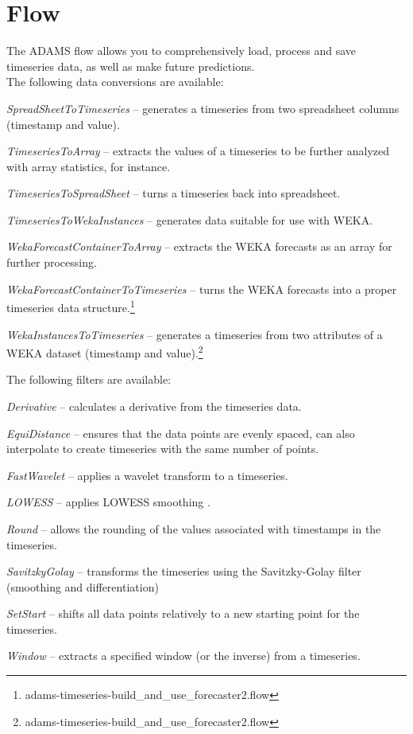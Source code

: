 \documentclass[a4paper]{book}
\begin{document}
\chapter{Flow}
The ADAMS flow allows you to comprehensively load, process and save timeseries
data, as well as make future predictions. \\

\noindent The following data conversions are available:
\begin{tight_itemize}
	\item \textit{SpreadSheetToTimeseries} -- generates a timeseries from two
	spreadsheet columns (timestamp and value).
	\item \textit{TimeseriesToArray} -- extracts the values of a timeseries to
	be further analyzed with array statistics, for instance.
	\item \textit{TimeseriesToSpreadSheet} -- turns a timeseries back into
	spreadsheet.
	\item \textit{TimeseriesToWekaInstances} -- generates data suitable for use
	with WEKA.
	\item \textit{WekaForecastContainerToArray} -- extracts the WEKA forecasts
	as an array for further processing.
	\item \textit{WekaForecastContainerToTimeseries} -- turns the WEKA forecasts
	into a proper timeseries data structure.\footnote{adams-timeseries-build\_and\_use\_forecaster2.flow}
	\item \textit{WekaInstancesToTimeseries} -- generates a timeseries from
	two attributes of a WEKA dataset (timestamp and value).\footnote{adams-timeseries-build\_and\_use\_forecaster2.flow}
\end{tight_itemize}

\noindent The following filters are available:
\begin{tight_itemize}
	\item \textit{Derivative} -- calculates a derivative from the timeseries 
	data.
	\item \textit{EquiDistance} -- ensures that the data points are evenly 
	spaced, can also interpolate to create timeseries with the same number of
	points.
	\item \textit{FastWavelet} -- applies a wavelet transform to a timeseries.
	\item \textit{LOWESS} -- applies LOWESS smoothing \cite{lowess}.
	\item \textit{Round} -- allows the rounding of the values associated with
	timestamps in the timeseries.
	\item \textit{SavitzkyGolay} -- transforms the timeseries using the
	Savitzky-Golay filter (smoothing and differentiation) \cite{savitzky}
	\item \textit{SetStart} -- shifts all data points relatively to a new 
	starting point for the timeseries.
	\item \textit{Window} -- extracts a specified window (or the inverse) from
	a timeseries.
\end{tight_itemize}
\end{document}

